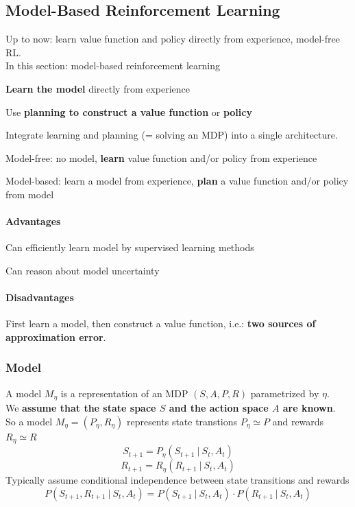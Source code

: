\documentclass[10pt]{report}
\begin{document}
\subsection{Model-Based Reinforcement Learning}
Up to now: learn value function and policy directly from experience, model-free RL.\\
In this section: model-based reinforcement learning\begin{list}{}{}
	\item \textbf{Learn the model} directly from experience
	\item Use \textbf{planning to construct a value function} or \textbf{policy}
\end{list}
Integrate learning and planning (= solving an MDP) into a single architecture.
\begin{list}{}{}
	\item Model-free: no model, \textbf{learn} value function and/or policy from experience
	\item Model-based: learn a model from experience, \textbf{plan} a value function and/or policy from model
\end{list}
\paragraph{Advantages}\begin{list}{}{}
	\item Can efficiently learn model by supervised learning methods
	\item Can reason about model uncertainty
\end{list}
\paragraph{Disadvantages}\begin{list}{}{}
	\item First learn a model, then construct a value function, i.e.: \textbf{two sources of approximation error}.
\end{list}
\subsubsection{Model}
A model $M_\eta$ is a representation of an MDP $(S,A,P,R)$ parametrized by $\eta$.\\
We \textbf{assume that the state space $S$ and the action space $A$ are known}.\\
So a model $M_\eta=(P_\eta,R_\eta)$ represents state transtions $P_\eta \simeq P$ and rewards $R_\eta \simeq R$
$$S_{t+1} = P_\eta(S_{t+1}\:|\:S_t,A_t)$$
$$R_{t+1} = R_\eta(R_{t+1}\:|\:S_t,A_t)$$
Typically assume conditional independence between state transitions and rewards
$$P(S_{t+1},R_{t+1}\:|\:S_t,A_t) = P(S_{t+1}\:|\:S_t,A_t)\cdot P(R_{t+1}\:|\:S_t,A_t)$$
\end{document}
